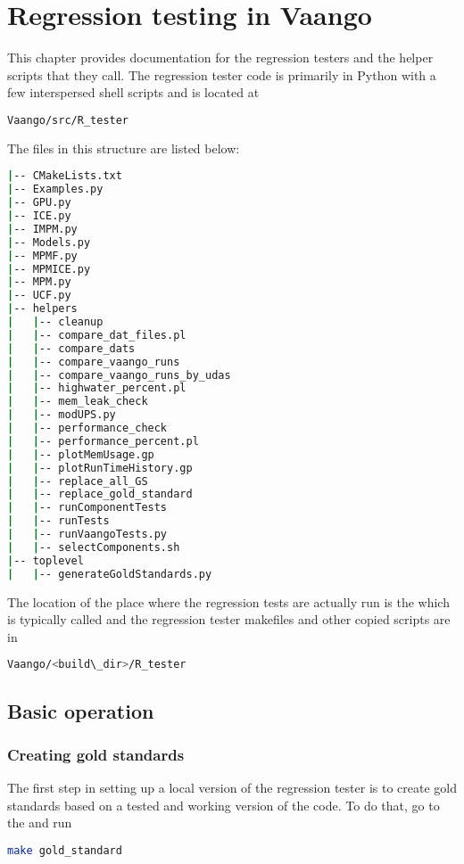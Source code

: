 \chapter{Regression testing in Vaango}
This chapter provides documentation for the \Vaango regression testers and the helper
scripts that they call.  The regression tester code is primarily in Python 
with a few interspersed shell scripts and is located at
\begin{lstlisting}[language=sh, backgroundcolor=\color{background}]
Vaango/src/R_tester
\end{lstlisting}
The files in this structure are listed below:
\begin{lstlisting}[language=sh, backgroundcolor=\color{background}]
|-- CMakeLists.txt
|-- Examples.py
|-- GPU.py
|-- ICE.py
|-- IMPM.py
|-- Models.py
|-- MPMF.py
|-- MPMICE.py
|-- MPM.py
|-- UCF.py
|-- helpers
|   |-- cleanup
|   |-- compare_dat_files.pl
|   |-- compare_dats
|   |-- compare_vaango_runs
|   |-- compare_vaango_runs_by_udas
|   |-- highwater_percent.pl
|   |-- mem_leak_check
|   |-- modUPS.py
|   |-- performance_check
|   |-- performance_percent.pl
|   |-- plotMemUsage.gp
|   |-- plotRunTimeHistory.gp
|   |-- replace_all_GS
|   |-- replace_gold_standard
|   |-- runComponentTests
|   |-- runTests
|   |-- runVaangoTests.py
|   |-- selectComponents.sh
|-- toplevel
|   |-- generateGoldStandards.py
\end{lstlisting}

The location of the place where the regression tests are actually run
is the  which is typically called 
and the regression tester makefiles and other copied scripts are in
\begin{lstlisting}[language=sh, backgroundcolor=\color{background}]
Vaango/<build\_dir>/R_tester
\end{lstlisting}

\section{Basic operation}
\subsection{Creating gold standards}
The first step in setting up a local version of the regression tester
is to create gold standards based on a tested and working version of the code.
To do that, go to the  and run
\begin{lstlisting}[language=sh, backgroundcolor=\color{background}]
make gold_standard
\end{lstlisting}

